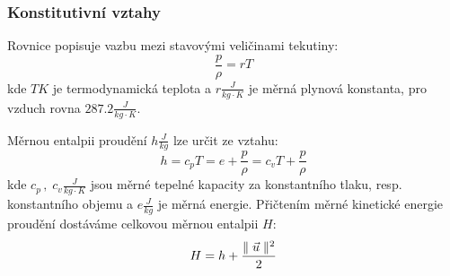         \subsubsection{Konstitutivní vztahy}
        Rovnice popisuje vazbu mezi stavovými veličinami tekutiny:
        \begin{equation} \label{eq:stavova-rovnice}
            \frac{p}{\rho} = r T
        \end{equation}
        \noindent kde $T \unit{K}$ je termodynamická teplota a $r \unit{\frac{J}{kg \cdot K}}$ je měrná plynová konstanta, pro vzduch rovna $287.2 \unit{\frac{J}{kg \cdot K}}$.
        
        Měrnou entalpii proudění $h \unit{\frac{J}{kg}}$ lze určit ze vztahu:
        \begin{equation} \label{eq:entalpie}
            h = c_p T = e + \frac{p}{\rho} = c_v T + \frac{p}{\rho}
        \end{equation}
        \noindent kde $c_p \, , \; c_v  \unit{\frac{J}{kg \cdot K}}$ jsou měrné tepelné kapacity za konstantního tlaku, resp. konstantního objemu a $e \unit{\frac{J}{kg}}$ je měrná energie. Přičtením měrné kinetické energie proudění dostáváme celkovou měrnou entalpii $H$:
        \begin{equation} \label{eq:celkova-entalpie}
            H = h + \frac{\parallel \Vec{u} \parallel^2}{2}
        \end{equation}
        
